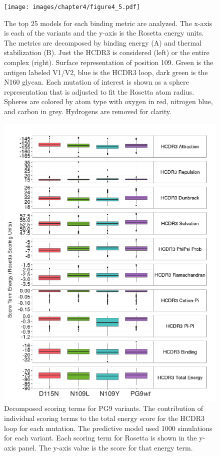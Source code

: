 \begin{figure}[!t]
   \centering
   \texttt{[image: images/chapter4/figure4\_5.pdf]} %
   \caption[Predictive Models of PG9 Variants that Enhanced Binding]{The top 25 models for each binding metric are analyzed. The x-axis is each of the variants and the y-axis is the Rosetta energy units. The metrics are decomposed by binding energy (A) and thermal stabilization (B). Just the HCDR3 is considered (left) or the entire complex (right). Surface representation of position 109. Green is the antigen labeled V1/V2, blue is the HCDR3 loop, dark green is the N160 glycan. Each mutation of interest is shown as a sphere representation that is adjusted to fit the Rosetta atom radius. Spheres are colored by atom type with oxygen in red, nitrogen blue, and carbon in grey. Hydrogens are removed for clarity.}
   \label{fig:figure4_5}
\end{figure}


\begin{figure}[!t]
   \centering
   \includegraphics[scale=1.4]{images/chapter4/figure4_6.pdf} %
   \caption[Decomposed Scoring Terms for PG9 Variants]{Decomposed scoring terms for PG9 variants. The contribution of individual scoring terms to the total energy score for the HCDR3 loop for each mutation. The predictive model used 1000 simulations for each variant. Each scoring term for Rosetta is shown in the y-axis panel. The y-axis value is the score for that energy term.}
   \label{fig:figure4_6}
\end{figure}


